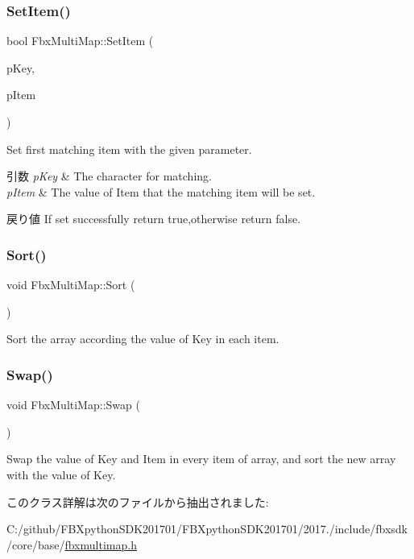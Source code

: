 \subsubsection{\texorpdfstring{Set\+Item()}{SetItem()}}
{\footnotesize\ttfamily bool Fbx\+Multi\+Map\+::\+Set\+Item (\begin{DoxyParamCaption}\item[{Fbx\+Handle}]{p\+Key,  }\item[{Fbx\+Handle}]{p\+Item }\end{DoxyParamCaption})}

Set first matching item with the given parameter. 
\begin{DoxyParams}{引数}
{\em p\+Key} & The character for matching. \\
\hline
{\em p\+Item} & The value of Item that the matching item will be set. \\
\hline
\end{DoxyParams}
\begin{DoxyReturn}{戻り値}
If set successfully return true,otherwise return false. 
\end{DoxyReturn}
\mbox{\label{class_fbx_multi_map_affec6231b7c9cc7455c8ad9b8106332a}} 
\subsubsection{\texorpdfstring{Sort()}{Sort()}}
{\footnotesize\ttfamily void Fbx\+Multi\+Map\+::\+Sort (\begin{DoxyParamCaption}{ }\end{DoxyParamCaption})}

Sort the array according the value of Key in each item. \mbox{\label{class_fbx_multi_map_a6a70e16ab207c85ab270fd779642667d}} 
\subsubsection{\texorpdfstring{Swap()}{Swap()}}
{\footnotesize\ttfamily void Fbx\+Multi\+Map\+::\+Swap (\begin{DoxyParamCaption}{ }\end{DoxyParamCaption})}

Swap the value of Key and Item in every item of array, and sort the new array with the value of Key. 

このクラス詳解は次のファイルから抽出されました\+:\begin{DoxyCompactItemize}
\item 
C\+:/github/\+F\+B\+Xpython\+S\+D\+K201701/\+F\+B\+Xpython\+S\+D\+K201701/2017./include/fbxsdk/core/base/\hyperlink{fbxmultimap_8h}{fbxmultimap.\+h}\end{DoxyCompactItemize}

